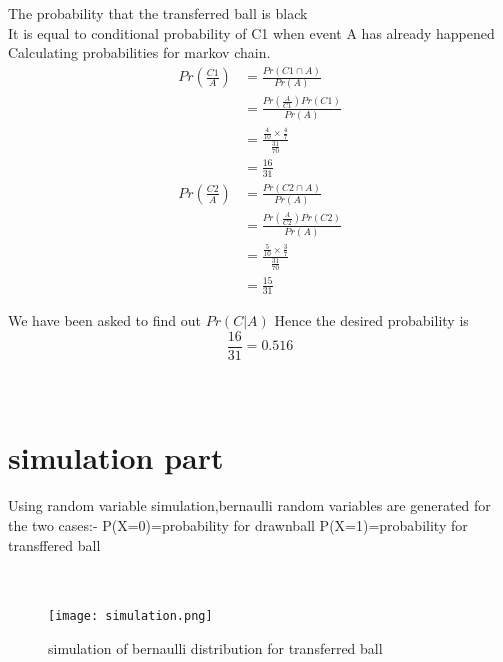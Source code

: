\documentclass[journel,12pt,twocoloums]{IEEEtran}
\begin{document}
The probability that the transferred ball is black\\
It is equal to conditional probability of C1 when event A has already happened\\
Calculating probabilities for markov chain.\\
\begin{align*}
Pr(\frac{C1}{A})&=\frac{Pr(C1 \cap A)}{Pr(A)}\\
        &=\frac{Pr(\frac{A}{C1})Pr(C1)}{Pr(A)}\\
        &=\frac{\frac{4}{10} \times \frac{4}{7}}{\frac{31}{70}}\\
        &=\frac{16}{31}
\end{align*}
\begin{align*}
Pr(\frac{C2}{A})&=\frac{Pr(C2 \cap A)}{Pr(A)}\\
        &=\frac{Pr(\frac{A}{C2})Pr(C2)}{Pr(A)}\\
        &=\frac{\frac{5}{10} \times \frac{3}{7}}{\frac{31}{70}}\\
        &=\frac{15}{31}
\end{align*}

We have been asked to find out $Pr(C|A)$
Hence the desired probability is $$\frac{16}{31}=0.516$$\\
\\

\section{simulation part}

Using random variable simulation,bernaulli random variables are generated for the two cases:-
P(X=0)=probability for drawnball
P(X=1)=probability for transffered ball \\
\\
\\

\begin{figure}[!htb]
    \centering
    \texttt{[image: simulation.png]}
    \caption{simulation of bernaulli distribution for transferred ball}
    \label{fig:frequency vs n}
\end{figure}
\end{document}

